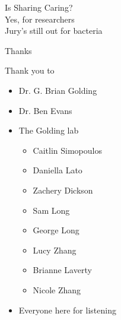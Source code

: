 \documentclass[dvipsnames]{beamer}
\begin{document}
\begin{frame}[fragile]{}%
    \begin{center}
         \Huge \textcolor{OliveGreen}{Is Sharing Caring?}\\
        \vspace{0.2in}
        \Large
         Yes, for researchers\\
         Jury's still out for bacteria
    \end{center}
\end{frame}
\begin{frame}[fragile]{Thanks}
    \begin{multicols}{2}
    \begin{minipage}[b][40ex][t]{\linewidth}
    Thank you to
    \begin{itemize}
        \item Dr. G. Brian Golding
        \item Dr. Ben Evans
        \item The Golding lab
            \begin{itemize}
                \item Caitlin Simopoulos
                \item Daniella Lato
                \item Zachery Dickson
                \item Sam Long
                \item George Long
                \item Lucy Zhang
                \item Brianne Laverty
                \item Nicole Zhang
            \end{itemize}
        \item Everyone here for listening
    \end{itemize}
    \end{minipage}
    \begin{minipage}[b][20ex][t]{\linewidth}
    \begin{figure}[htb!]

\end{figure}
\end{minipage}
\end{multicols}
\end{frame}
\end{document}
